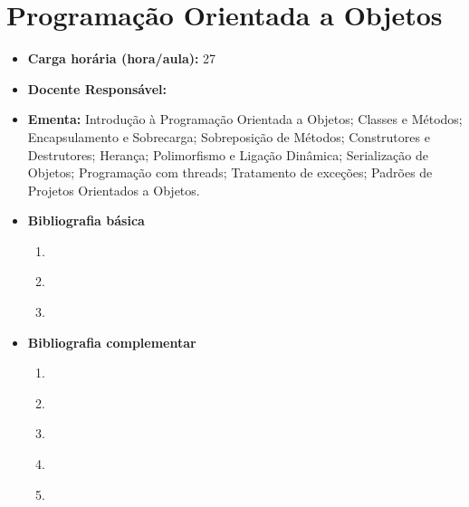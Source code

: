 \documentclass[
	10pt,				%
	openright,			%
	twoside,			%
	a4paper,			%
	english,			%
	french,				%
	brazil,				%
	sumario=tradicional
]{abntex2}
\begin{document}
\section*{Programação Orientada a Objetos}\label{3_poo}
\begin{itemize}
	\item \textbf{Carga horária (hora/aula):} 27
	\item \textbf{Docente Responsável:}
	\item \textbf{Ementa:} 
	Introdução à Programação Orientada a Objetos; 
	Classes e Métodos; 
	Encapsulamento e Sobrecarga; 
	Sobreposição de Métodos; 
	Construtores e Destrutores;
	Herança; 
	Polimorfismo e Ligação Dinâmica; 
	Serialização de Objetos; 
	Programação com threads; 
	Tratamento de exceções;
	Padrões de Projetos Orientados a Objetos.
	
	\item \textbf{Bibliografia básica}
	\begin{enumerate}
		\item \cite{deiteldeitel2010}
		\item \cite{santos2003}
		\item \cite{goncalves2007}
		
	\end{enumerate}
	\item \textbf{Bibliografia complementar}
	\begin{enumerate}
		\item \cite{gammahelmjohnsonvlissides2000}
		\item \cite{wazlawick2011analise}
		\item \cite{mclaughlinpollicewest2010}
		\item \cite{deiteldeitel2006}
		\item \cite{fowlertortello2005}
	\end{enumerate}	
\end{itemize}



\newpage
\end{document}
